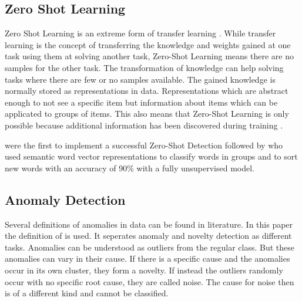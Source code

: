\subsection{Zero Shot Learning}
Zero Shot Learning is an extreme form of transfer learning \cite[S. 536]{goodfellow_deep_2016}. While transfer learning is the concept of transferring the knowledge and weights gained at one task using them at solving another task, Zero-Shot Learning means there are no samples for the other task. The transformation of knowledge can help solving tasks where there are few or no samples available. The gained knowledge is normally stored as representations in data. Representations which are abstract enough to not see a specific item but information about items which can be applicated to groups of items. This also means that Zero-Shot Learning is only possible because additional information has been discovered during training \cite[S. 536]{goodfellow_deep_2016}.

 were the first to implement a successful Zero-Shot Detection followed by  who used semantic word vector representations to classify words in groups and to sort new words with an accuracy of 90\% with a fully unsupervised model.
\subsection{Anomaly Detection}
Several definitions of anomalies in data can be found in literature. In this paper the definition of  is used. It seperates anomaly and novelty detection as different tasks. Anomalies can be understood as outliers from the regular class. But these anomalies can vary in their cause. If there is a specific cause and the anomalies occur in its own cluster, they form a novelty. If instead the outliers randomly occur with no specific root cause, they are called noise. The cause for noise then is of a different kind and cannot be classified.

